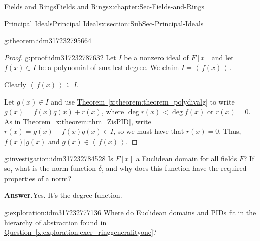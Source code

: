\documentclass[oneside,10pt,]{book}
\newcommand{\blocktitlefont}{\relax}
\newcommand{\xreffont}{\relax}
\numberwithin{equation}{section}
\newcommand{\ideal}[1]{\left\langle\, #1 \,\right\rangle}
\newcommand{\lt}{<}
\begin{document}
\begin{chapterptx}{Fields and Rings}{}{Fields and Rings}{}{}{x:chapter:Sec-Fields-and-Rings}
\begin{sectionptx}{Principal Ideals}{}{Principal Ideals}{}{}{x:section:SubSec-Principal-Ideals}
\begin{theorem}{}{}{g:theorem:idm317232795664}
\end{theorem}
\begin{proof}{}{g:proof:idm317232787632}
Let \(I\) be a nonzero ideal of \(F[x]\) and let \(f(x)\in I\) be a polynomial of smallest degree. We claim \(I = \ideal{f(x)}\).%
\par
Clearly \(\ideal{f(x)}\subseteq I\).%
\par
Let \(g(x)\in I\) and use \hyperref[x:theorem:theorem_polydivalg]{Theorem~{\xreffont\ref{x:theorem:theorem_polydivalg}}} to write \(g(x) = f(x) q(x) + r(x)\), where \(\deg r(x) \lt \deg f(x)\) or \(r(x) = 0\). As in \hyperref[x:theorem:thm_ZisPID]{Theorem~{\xreffont\ref{x:theorem:thm_ZisPID}}}, write \(r(x) = g(x) - f(x) q(x) \in I\), so we must have that \(r(x) = 0\). Thus, \(f(x) | g(x)\) and \(g(x)\in \ideal{f(x)}\).%
\end{proof}
\begin{investigation}{}{g:investigation:idm317232784528}%
Is \(F[x]\) a Euclidean domain for all fields \(F\)? If so, what is the norm function \(\delta\), and why does this function have the required properties of a norm?%
\par\smallskip%
\noindent\textbf{\blocktitlefont Answer}.\hypertarget{g:answer:idm317232777616}{}\quad{}Yes. It's the degree function.%
\end{investigation}
\begin{exploration}{}{g:exploration:idm317232777136}%
Where do Euclidean domains and PIDs fit in the hierarchy of abstraction found in \hyperref[x:exploration:exer_ringgeneralityone]{Question~{\xreffont\ref{x:exploration:exer_ringgeneralityone}}}?%
\end{exploration}
\end{sectionptx}
\end{chapterptx}
%
%
\typeout{************************************************}
\typeout{************************************************}
%
\end{document}
